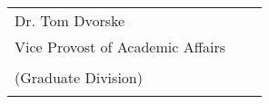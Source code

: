 \begin{center}
\begin{flushleft}
{\begin{tabular}{lll}
				Dr. Tom Dvorske & &\\
				Vice Provost of Academic Affairs  & &\\
				(Graduate Division) \hspace{1cm}  & \rule{6.5cm}{1pt} \hspace{0.5cm} & \rule{2.2cm}{1pt}\vspace*{3mm}\\
				
		\end{tabular}}%
	\end{flushleft}
\end{center}
\pagebreak